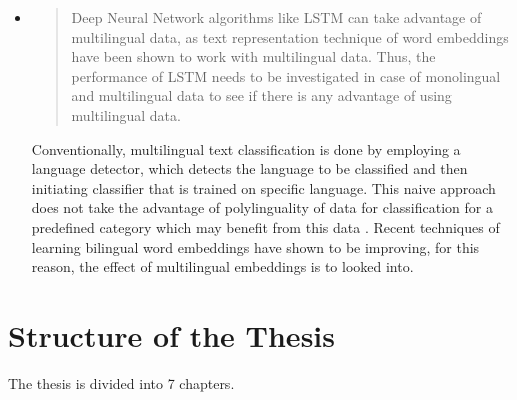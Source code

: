 \begin{itemize}
    
    \item
    \begin{quote}
      Deep Neural Network algorithms like LSTM can take advantage of multilingual data, as text representation technique of word embeddings have been shown to work with multilingual data. Thus, the performance of LSTM needs to be investigated in case of monolingual and multilingual data to see if there is any advantage of using multilingual data.
    \end{quote}
     Conventionally, multilingual text classification is done by employing a language detector, which detects the language to be classified and then initiating classifier that is trained on specific language. This naive approach does not take the advantage of polylinguality of data for classification for a predefined category which may benefit from this data \cite{Wei:2014:EPD:2566999.2567111}. Recent techniques of learning bilingual word embeddings \cite{D13-1141,NIPS2014_5270} have shown to be improving, for this reason, the effect of multilingual embeddings is to looked into. 
\end{itemize}

\section{Structure of the Thesis}
The thesis is divided into 7 chapters. 